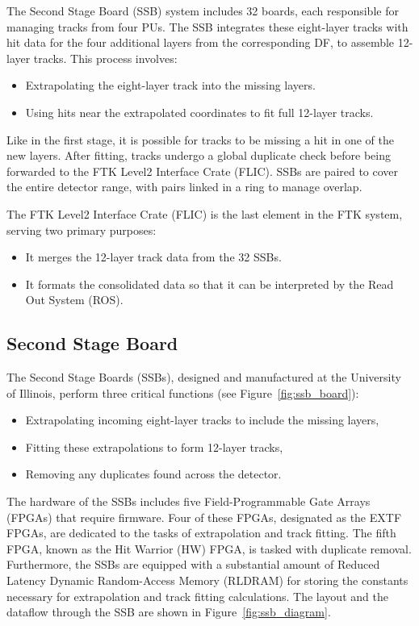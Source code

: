 The Second Stage Board (SSB) system includes 32 boards, each responsible for managing tracks from four PUs. The SSB integrates these eight-layer tracks with hit data for the four additional layers from the corresponding DF, to assemble 12-layer tracks. This process involves:
\begin{itemize}
    \item Extrapolating the eight-layer track into the missing layers.
    \item Using hits near the extrapolated coordinates to fit full 12-layer tracks.
\end{itemize}
Like in the first stage, it is possible for tracks to be missing a hit in one of the new layers. After fitting, tracks undergo a global duplicate check before being forwarded to the FTK Level2 Interface Crate (FLIC). SSBs are paired to cover the entire detector range, with pairs linked in a ring to manage overlap.

The FTK Level2 Interface Crate (FLIC) is the last element in the FTK system, serving two primary purposes:
\begin{itemize}
    \item It merges the 12-layer track data from the 32 SSBs.
    \item It formats the consolidated data so that it can be interpreted by the Read Out System (ROS).
\end{itemize}

\subsection{Second Stage Board}

The Second Stage Boards (SSBs), designed and manufactured at the University of Illinois, perform three critical functions (see Figure~\ref{fig:ssb_board}):
\begin{itemize}
    \item Extrapolating incoming eight-layer tracks to include the missing layers,
    \item Fitting these extrapolations to form 12-layer tracks,
    \item Removing any duplicates found across the detector.
\end{itemize}
The hardware of the SSBs includes five Field-Programmable Gate Arrays (FPGAs) that require firmware. Four of these FPGAs, designated as the EXTF FPGAs, are dedicated to the tasks of extrapolation and track fitting. The fifth FPGA, known as the Hit Warrior (HW) FPGA, is tasked with duplicate removal. Furthermore, the SSBs are equipped with a substantial amount of Reduced Latency Dynamic Random-Access Memory (RLDRAM) for storing the constants necessary for extrapolation and track fitting calculations.
The layout and the dataflow through the SSB are shown in Figure~\ref{fig:ssb_diagram}.

